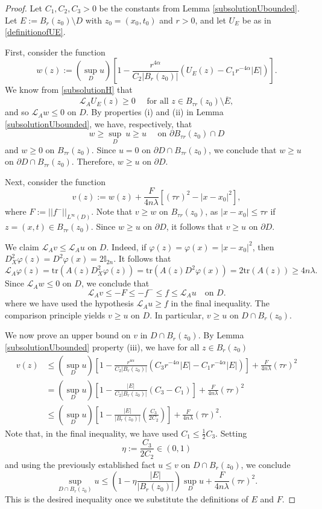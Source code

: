 \documentclass[12pt]{amsart}
\newcommand{\Lop}{\mathcal{L}}
\def \tr {\mathrm{tr}}
\def \L {\mathcal{L}}
\def \a {\alpha}
\def \t {\tau}
\def \tr {\mathrm{tr}}
\begin{document}
\begin{proof} Let $C_1, C_2, C_3 > 0$ be the constants from Lemma \ref{subsolutionUbounded}. Let $E:= B_r(z_0) \setminus D$ with $z_0=(x_0,t_0)$ and $r>0$, and let $U_E$ be as in \eqref{definitionofUE}. 

First, consider the function
$$w(z) := \left(\sup_D u \right) \left[1 - \frac{r^{4\a}}{C_2 |B_r(z_0)|} \left(U_E(z) - C_1 r^{-4\a}|E| \right) \right].$$
We know from \eqref{subsolutionH} that 
\[\Lop_A U_E(z) \geq 0 \quad \text{ for all } z \in B_{\t r}(z_0) \setminus \overline{E},\]
and so $\L_A w \leq 0$ on $D$. By properties (i) and (ii) in Lemma \ref{subsolutionUbounded}, we have, respectively, that 
\[w \geq \underset{D}{\sup} \ u \geq u \quad \text{ on } \partial B_{\t r}(z_0) \cap D\]
and $w \geq 0$ on $B_{\t r}(z_0)$. Since $u = 0$ on $\partial D \cap B_{\t r}(z_0)$, we conclude that $w \geq u$ on $\partial D \cap B_{\t r}(z_0)$. Therefore, $w \geq u$ on $\partial D$.

Next, consider the function
$$v(z) := w(z) + \frac{F}{4n\lambda}\left[(\tau r)^2 - |x - x_0|^2 \right],$$
where $F := ||f^-||_{L^{\infty}(D)}$. Note that $v \geq w$ on $B_{\t r}(z_0)$, as $|x - x_0| \leq \t r$ if $z = (x,t) \in B_{\t r}(z_0)$. Since $w \geq u$ on $\partial D$, it follows that $v \geq u$ on $\partial D$. 

We claim $\L_A v \leq \L_A u$ on $D$. Indeed, if $\varphi(z) = \varphi(x) = |x-x_0|^2$, then $D^2_X \varphi(z) = D^2\varphi(x) = 2 \mathbb{I}_{2n}$. It follows that
\begin{equation}\label{4nla}
\L_A \varphi(z) = \tr(A(z) D^2_X \varphi(z)) = \tr(A(z) D^2 \varphi(x)) = 2 \tr(A(z)) \geq 4n \lambda.
\end{equation}
Since $\L_A w \leq 0$ on $D$, we conclude that 
\[\L_A v \leq -F \leq -f^-\leq f \leq \L_A u\quad \text{on } D.\]
where we have used the hypothesis $\L_A u \geq f$ in the final inequality. The comparison principle yields $v \geq u$ on $D$. In particular, $v \geq u$ on $D \cap B_r(z_0)$. 

We now prove an upper bound on $v$ in $D \cap B_r(z_0)$. By Lemma \ref{subsolutionUbounded} property (iii), we have for all $z \in B_r(z_0)$
\begin{align*}
v(z) & \leq \left(\sup_D u \right) \left[1 - \frac{r^{4\a}}{C_2 |B_r(z_0)|} \left(C_3 r^{-4\a}|E| - C_1 r^{-4\a}|E| \right) \right] + \frac{F}{4n\lambda} (\tau r)^2 \\
& = \left(\sup_D u \right) \left[1 - \frac{|E|}{C_2 |B_r(z_0)|} \left(C_3 - C_1 \right) \right] + \frac{F}{4n\lambda} (\tau r)^2\\
& \leq \left(\sup_D u \right) \left[1 - \frac{|E|}{|B_r(z_0)|} \left(\frac{C_3}{2C_2} \right) \right] + \frac{F}{4n\lambda} (\tau r)^2.
\end{align*}
Note that, in the final inequality, we have used $C_1 \leq \frac{1}{2}C_3$. Setting 
$$\eta := \dfrac{C_3}{2C_2} \in (0,1)$$ 
and using the previously established fact $u \leq v$ on $D \cap B_r(z_0)$, we conclude
$$
\sup_{D \cap B_r(z_0)} u \leq \left(1 - \eta \frac{|E|}{|B_r(z_0)|} \right) \sup_D u + \frac{F}{4n\lambda} (\tau r)^2.
$$
This is the desired inequality once we substitute the definitions of $E$ and $F$.
\end{proof}
\end{document}

